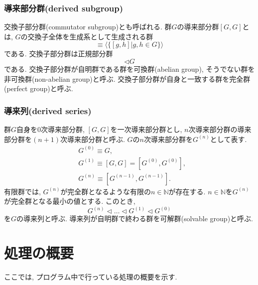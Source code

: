 \documentclass[11pt, a4paper]{jsarticle}
\begin{document}
\subsubsection{導来部分群(derived subgroup)}
交換子部分群(commutator subgroup)とも呼ばれる.
群$G$の導来部分群$[G,G]$とは, $G$の交換子全体を生成系として生成される群
\begin{equation}
	[G, G] \equiv \langle \{ [g,h] | g,h \in G \} \rangle
\end{equation}
である.
交換子部分群は正規部分群
\begin{equation}
	[G, G] \triangleleft G
\end{equation}
である.
交換子部分群が自明群である群を可換群(abelian group), そうでない群を非可換群(non-abelian group)と呼ぶ.
交換子部分群が自身と一致する群を完全群(perfect group)と呼ぶ.


\subsubsection{導来列(derived series)}
群$G$自身を0次導来部分群, $[G,G]$を一次導来部分群とし, $n$次導来部分群の導来部分群を$(n+1)$次導来部分群と呼ぶ.
$G$の$n$次導来部分群を$G^{(n)}$として表す.
\begin{equation}
\begin{split}
&G^{(0)} \equiv G, \\
&G^{(1)} \equiv [G,G] = [G^{(0)},G^{(0)}], \\
&G^{(n)} \equiv [G^{(n-1)},G^{(n-1)}].
\end{split}
\end{equation}
有限群では, $G^{(n)}$が完全群となるような有限の$n\in\mathbb{N}$が存在する.
$n\in\mathbb{N}$を$G^{(n)}$が完全群となる最小の値とする.
このとき,
\begin{equation}
G^{(n)} \triangleleft \dots \triangleleft G^{(1)} \triangleleft G^{(0)}
\end{equation}
を$G$の導来列と呼ぶ.
導来列が自明群で終わる群を可解群(solvable group)と呼ぶ.

\newpage
\section{処理の概要}
ここでは, プログラム中で行っている処理の概要を示す.








\end{document}
